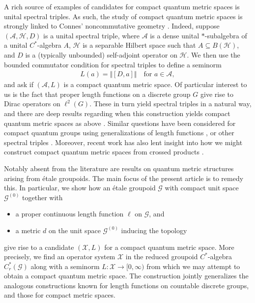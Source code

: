 \documentclass[11pt,a4paper,oneside,final,reqno]{amsart}
\theoremstyle{definition}
\newcommand{\G}{\mathcal{G}}
\newcommand{\Go}{\mathcal{G}^{(0)}}
\newcommand{\cX}{\mathcal{X}}
\newcommand{\curlyH}{\mathcal{H}}
\newcommand{\Cred}{C_{r}^{*}}
\numberwithin{equation}{section}
\begin{document}
	
	A rich source of examples of candidates for compact quantum metric spaces is unital spectral triples. As such, the study of compact quantum metric spaces is strongly linked to Connes' noncommutative geometry \cite{Connes1989, ConnesNCGBook}. Indeed, suppose $(\mathcal{A}, \curlyH, D)$ is a unital spectral triple, where $\mathcal{A}$ is a dense unital $*$-subalgebra of a unital $C^*$-algebra $A$, $\mathcal{H}$ is a separable Hilbert space such that $A \subseteq B(\curlyH)$, and $D$ is a (typically unbounded) self-adjoint operator on $\curlyH$. We then use the bounded commutator condition for spectral triples to define a seminorm
	\begin{align*}
		L(a) = \Vert [D, a]\Vert \quad \text{for $a \in \mathcal{A}$},
	\end{align*}
	and ask if $(\mathcal{A}, L)$ is a compact quantum metric space. 
	Of particular interest to us is the fact that proper  
	length functions on a discrete group $G$ give rise to Dirac operators on $\ell^2(G)$. These in turn yield spectral triples in a natural way, and there are deep results regarding when this construction yields compact quantum metric spaces as above \cite{Rieffel02CQMS, ChristensenIvanRD, OzawaRieffel2004, ChristRieffel}. 
	Similar questions have been considered for compact quantum groups using generalizations of length functions \cite{BhowmickVoigtZacharias2015, AustadKyed2026}, or other spectral triples \cite{AguilarKaad-Podles2018, KaadKyedSU2}. 
	Moreover, recent work has also lent insight into how we might construct compact quantum metric spaces from crossed products \cite{BellissardMarcolliReihani2010, HawkinsSkalskiWhiteZacharias2013, KlisseCQMS, AustadKaadKyed2025}.

	Notably absent from the literature are results on quantum metric structures arising from \'etale groupoids. 
	The main focus of the present article is to remedy this. In particular, we show how an \'etale groupoid $\G$ with compact unit space $\Go$ together with 
	\begin{itemize}
		\item a proper continuous length function $\ell$ on $\G$, and
		\item a metric $d$ on the unit space $\Go$ inducing the topology
	\end{itemize}
	give rise to a candidate $(\cX, L)$ for a compact quantum metric space. More precisely, we find an operator system $\cX$ in the reduced groupoid $C^*$-algebra $\Cred(\G)$ along with a seminorm $L \colon \cX \to [0,\infty)$ from which we may attempt to obtain a compact quantum metric space. 
	The construction jointly generalizes the analogous constructions known for length functions on countable discrete groups, and those for compact metric spaces. 
\end{document}
